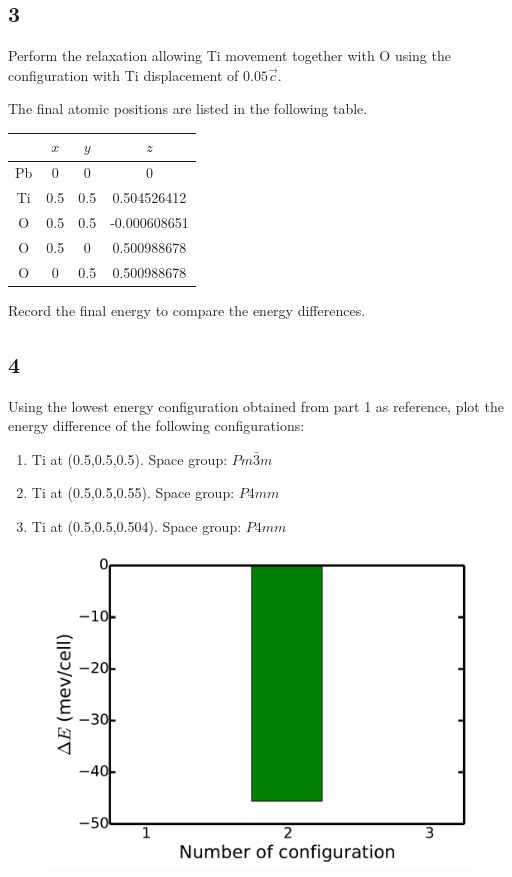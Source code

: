 \documentclass[12pt]{article}
\begin{document}
\subsection*{3}

Perform the relaxation allowing Ti movement together with O using the configuration with Ti displacement of $0.05\vec{c}$. 

 The final atomic positions are listed in the following table. 
\begin{center}
	\begin{tabular}{|c|c|c|c|}
		\hline
		 & $x$ & $y$ & $z$ \\ \hline
		Pb & 0 & 0 & 0 \\ \hline
		Ti & 0.5 & 0.5 & 0.504526412 \\ \hline
		O & 0.5 & 0.5 & -0.000608651 \\ \hline
		O & 0.5 & 0 & 0.500988678 \\ \hline
		O & 0 & 0.5 & 0.500988678 \\ \hline
	\end{tabular}
\end{center}

Record the final energy to compare the energy differences. 

\subsection*{4}

Using the lowest energy configuration obtained from part 1 as reference, plot the energy difference of the following  configurations: 
\begin{enumerate}
	\item Ti at (0.5,0.5,0.5). Space group: $Pm\bar{3}m$
	\item Ti at (0.5,0.5,0.55). Space group: $P4mm$
	\item Ti at (0.5,0.5,0.504). Space group: $P4mm$
\end{enumerate}

\begin{figure}[h]
\begin{center}
	\includegraphics[width=.5\textwidth]{pto_ed}
\end{center}
\end{figure}
\end{document}
